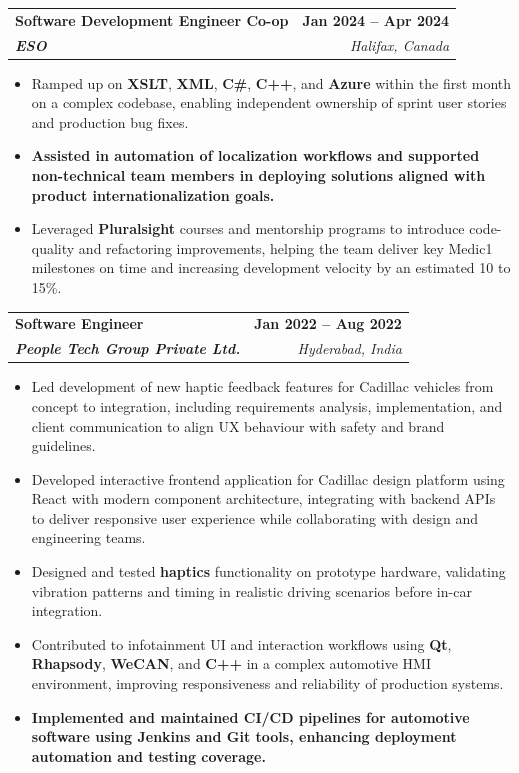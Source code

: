\documentclass[letterpaper,11pt]{article}
\makeatletter
\newcommand{\resumeItem}[1]{
  \item\small{
    {#1 \vspace{-2pt}}
  }
}
\newcommand{\resumeSubheading}[4]{
  \vspace{-2pt}\item
    \begin{tabular*}{1.0\textwidth}[t]{l@{\extracolsep{\fill}}r}
      \textbf{#1} & \textbf{\small #2} \\
      \textit{\small#3} & \textit{\small #4} \\
    \end{tabular*}\vspace{-7pt}
}
\newcommand{\resumeItemListStart}{\begin{itemize}}
\newcommand{\resumeItemListEnd}{\end{itemize}\vspace{-5pt}}
\makeatother
\begin{document}
    \resumeSubheading
      {\textbf{Software Development Engineer Co-op}}{\textbf{Jan 2024 -- Apr 2024}}
      {\textbf{ESO}}{Halifax, Canada}
      \resumeItemListStart
        \resumeItem{Ramped up on \textbf{XSLT}, \textbf{XML}, \textbf{C\#}, \textbf{C++}, and \textbf{Azure} within the first month on a complex codebase, enabling independent ownership of sprint user stories and production bug fixes.}
        \resumeItem{\textbf{Assisted in automation of localization workflows and supported non-technical team members in deploying solutions aligned with product internationalization goals.}}
        \resumeItem{Leveraged \textbf{Pluralsight} courses and mentorship programs to introduce code-quality and refactoring improvements, helping the team deliver key Medic1 milestones on time and increasing development velocity by an estimated 10 to 15\%.}
      \resumeItemListEnd

    \resumeSubheading
      {\textbf{Software Engineer}}{\textbf{Jan 2022 -- Aug 2022}}
      {\textbf{People Tech Group Private Ltd.}}{Hyderabad, India}
      \resumeItemListStart
        \resumeItem{Led development of new haptic feedback features for Cadillac vehicles from concept to integration, including requirements analysis, implementation, and client communication to align UX behaviour with safety and brand guidelines.}
        \resumeItem{Developed interactive frontend application for Cadillac design platform using React with modern component architecture, integrating with backend APIs to deliver responsive user experience while collaborating with design and engineering teams.}
        \resumeItem{Designed and tested \textbf{haptics} functionality on prototype hardware, validating vibration patterns and timing in realistic driving scenarios before in-car integration.}
        \resumeItem{Contributed to infotainment UI and interaction workflows using \textbf{Qt}, \textbf{Rhapsody}, \textbf{WeCAN}, and \textbf{C++} in a complex automotive HMI environment, improving responsiveness and reliability of production systems.}
        \resumeItem{\textbf{Implemented and maintained CI/CD pipelines for automotive software using \textbf{Jenkins} and Git tools, enhancing deployment automation and testing coverage.}}
      \resumeItemListEnd
\end{document}
